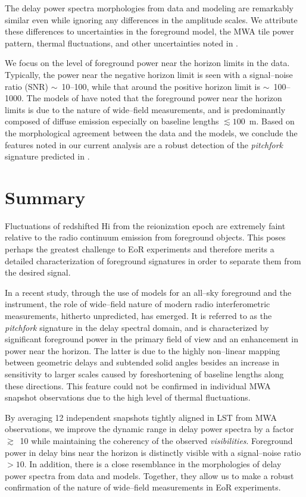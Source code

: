 \documentclass[preprint2,apjl,numberedappendix,twocolappendix,appendixfloats]{emulateapj}
\begin{document}
The delay power spectra morphologies from data and modeling are remarkably similar even while ignoring any differences in the amplitude scales. We attribute these differences to uncertainties in the foreground model, the MWA tile power pattern, thermal fluctuations, and other uncertainties noted in \citet{thy15}. 

We focus on the level of foreground power near the horizon limits in the data. Typically, the power near the negative horizon limit is seen with a signal--noise ratio (SNR) $\sim$~10--100, while that around the positive horizon limit is $\sim$~100--1000. The models of \citet{thy15} have noted that the foreground power near the horizon limits is due to the nature of wide--field measurements, and is predominantly composed of diffuse emission especially on baseline lengths $\lesssim 100$~m. Based on the morphological agreement between the data and the models, we conclude the features noted in our current analysis are a robust detection of the {\it pitchfork} signature predicted in \citet{thy15}.

\section{Summary}\label{sec:summary}

Fluctuations of redshifted H{\sc i} from the reionization epoch are extremely faint relative to the radio continuum emission from foreground objects. This poses perhaps the greatest challenge to EoR experiments and therefore merits a detailed characterization of foreground signatures in order to separate them from the desired signal. 

In a recent study, through the use of models for an all--sky foreground and the instrument, the role of wide--field nature of modern radio interferometric measurements, hitherto unpredicted, has emerged. It is referred to as the {\it pitchfork} signature in the delay spectral domain, and is characterized by significant foreground power in the primary field of view and an enhancement in power near the horizon. The latter is due to the highly non--linear mapping between geometric delays and subtended solid angles besides an increase in sensitivity to larger scales caused by foreshortening of baseline lengths along these directions. This feature could not be confirmed in individual MWA snapshot observations due to the high level of thermal fluctuations. 

By averaging 12 independent snapshots tightly aligned in LST from MWA observations, we improve the dynamic range in delay power spectra by a factor $\gtrsim$~10 while maintaining the coherency of the observed {\it visibilities}. Foreground power in delay bins near the horizon is distinctly visible with a signal--noise ratio $>10$. In addition, there is a close resemblance in the morphologies of delay power spectra from data and models. Together, they allow us to make a robust confirmation of the nature of wide--field measurements in EoR experiments.
\end{document}
